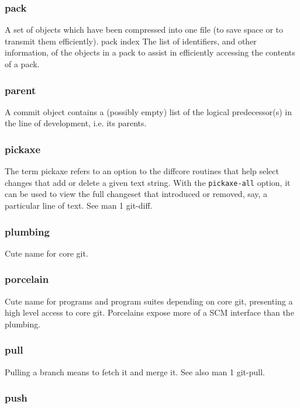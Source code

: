 \subsubsection{pack}

A set of objects which have been compressed into one file (to save space or to transmit them efficiently).
pack index
The list of identifiers, and other information, of the objects in a pack to assist in efficiently accessing the contents of a pack.

\subsubsection{parent}

A commit object contains a (possibly empty) list of the logical predecessor(s) in the line of development, i.e. its parents.

\subsubsection{pickaxe}

The term pickaxe refers to an option to the diffcore routines that help select changes that add or delete a given text string. With the \texttt{pickaxe-all} option, it can be used to view the full changeset that introduced or removed, say, a particular line of text. See man 1 git-diff.

\subsubsection{plumbing}

Cute name for core git.

\subsubsection{porcelain}

Cute name for programs and program suites depending on core git, presenting a high level access to core git. Porcelains expose more of a SCM interface than the plumbing.

\subsubsection{pull}

Pulling a branch means to fetch it and merge it. See also man 1 git-pull.

\subsubsection{push}

